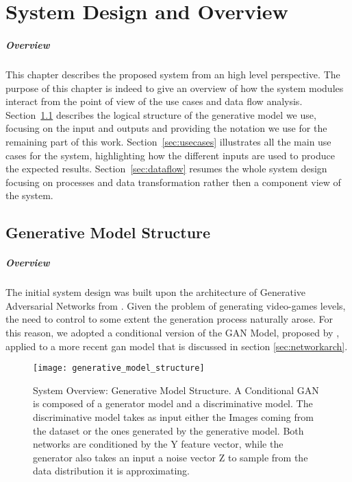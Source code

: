 \chapter{System Design and Overview}
\label{ch:system_design}
\paragraph{Overview}
 This chapter describes the proposed system from an high level perspective. The purpose of this chapter is indeed to give an overview of how the system modules interact from the point of view of the use cases and data flow analysis. Section~\ref{sec:modelstructure} describes the logical structure of the generative model we use, focusing on the input and outputs and providing the notation we use for the remaining part of this work.
 Section~\ref{sec:usecases} illustrates all the main use cases for the system, highlighting how the different inputs are used to produce the expected results.
 Section~\ref{sec:dataflow} resumes the whole system design focusing on processes and data transformation rather then a component view of the system. 


\section{Generative Model Structure}
\label{sec:modelstructure}
\paragraph{Overview} The initial system design was built upon the architecture of Generative Adversarial Networks \cite{gan} from \citeauthor{gan}. Given the problem of generating video-games levels, the need to control to some extent the generation process naturally arose. For this reason, we adopted a conditional version \cite{conditionalgan} of the GAN Model, proposed by \citeauthor{conditionalgan}, applied to a more recent \gls{gan} model that is discussed in section \ref{sec:networkarch}.


\begin{figure}[h!]
	\begin{center}
		\texttt{[image: generative\_model\_structure]}
	\end{center}
	
	\captionsetup{width=\linewidth}
	\caption[System Overview: Generative Model Structure]{ System Overview: Generative Model Structure. A Conditional GAN is composed of a generator model and a discriminative model. The discriminative model takes as input either the Images coming from the dataset or the ones generated by the generative model. Both networks are conditioned by the Y feature vector, while the generator also takes an input a noise vector Z to sample from the data distribution it is approximating. }
	\label{fig:genmodelstructure}
\end{figure}


